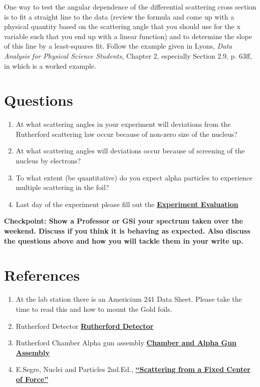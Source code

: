 \documentclass{../lab}
\begin{document}
One way to test the angular dependence of the differential scattering cross section is to fit a straight line to the data (review the formula and come up with a physical quantity based on the scattering angle that you should use for the x variable such that you end up with a linear function) and to determine the slope of this line by a least-squares fit. Follow the example given in Lyons, \emph{Data Analysis for Physical Science Students, }Chapter 2, especially Section 2.9, p. 63ff, in which is a worked example.

\section{Questions}

\begin{enumerate}
    \item At what scattering angles in your experiment will deviations from the Rutherford scattering law occur because of non-zero size of the nucleus?

    \item At what scattering angles will deviations occur because of screening of the nucleus by electrons?

    \item To what extent (be quantitative) do you expect alpha particles to experience multiple scattering in the foil?

    \item Last day of the experiment please fill out the \href{\ExperimentEvaluation}{\textbf{Experiment Evaluation}}

\end{enumerate}


\textbf{Checkpoint: Show a Professor or GSi your spectrum taken over the weekend. Discuss if you think it is behaving as expected. Also discuss the questions above and how you will tackle them in your write up. }
\section{References}
\label{sec:References}

\begin{enumerate}
    \item At the lab station there is an Americium 241 Data Sheet. Please take the time to read this and how to mount the Gold foils.

    \item Rutherford Detector \href{http://physics111.lib.berkeley.edu/Physics111/Reprints/RUT/RUT\_Detector\_018.JPG}{\textbf{Rutherford Detector}}

    \item Rutherford Chamber Alpha gun assembly \href{http://physics111.lib.berkeley.edu/Physics111/Reprints/RUT/RUT\_Chamber\_017.JPG}{\textbf{Chamber and Alpha Gun Assembly}}

    \item E.Segre, Nuclei and Particles 2nd.Ed., \href{http://physics111.lib.berkeley.edu/Physics111/Reprints/RUT/Scattering\%20From\%20Center\%20appendix\%20a.pdf}{\textbf{``Scattering from a Fixed Center of Force''}}

\end{enumerate}
\end{document}
